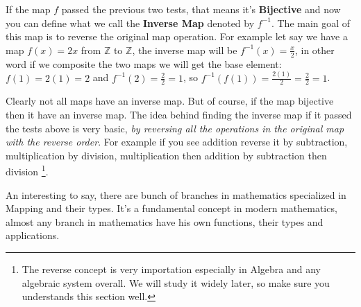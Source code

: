 If the map $f$ passed the previous two tests, that means it's {\bf Bijective} and now you can define what we call the {\bf Inverse Map} denoted by $f^{-1}$. The main goal of this map is to reverse the original map operation. For example let say we have a map $f(x)=2x$ from $\mathbb{Z}$ to $\mathbb{Z}$, the inverse map will be $f^{-1}(x)=\frac{x}{2}$, in other word if we composite the two maps we will get the base element: $f(1)=2(1)=2$ and $f^{-1}(2)=\frac{2}{2}=1$, so $f^{-1}(f(1))=\frac{2(1)}{2}=\frac{2}{2}=1$.

Clearly not all maps have an inverse map. But of course, if the map bijective then it have an inverse map. The idea behind finding the inverse map if it passed the tests above is very basic, {\it by reversing all the operations in the original map with the reverse order}. For example if you see addition reverse it by subtraction, multiplication by division, multiplication then addition by subtraction then division \footnote{The reverse concept is very importation especially in Algebra and any algebraic system overall. We will study it widely later, so make sure you understands this section well.}.

An interesting to say, there are bunch of branches in mathematics specialized in Mapping and their types. It's a fundamental concept in modern mathematics, almost any branch in mathematics have his own functions, their types and applications.